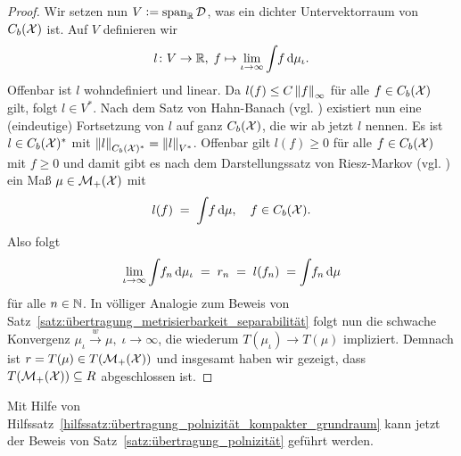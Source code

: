 \documentclass[../thesis/thesis.tex]{subfiles}
\begin{document}
\begin{proof}
		Wir setzen nun $V \vcentcolon = \mathrm{span}_{\mathbb{R}} \, \mathcal{D}$, was ein dichter Untervektorraum von $C_b(\mathcal{X})$ ist. Auf $V$ definieren wir
		\[ l \colon V \to \mathbb{R}, \; f \mapsto \lim_{\iota \to \infty} \int_{} \, f \, \mathrm{d}\mu_\iota  \text{.} \]
		Offenbar ist $l$ wohndefiniert und linear. Da $l(f) \leq C \left\lVert f\right\rVert_\infty$ für alle $f \in C_b(\mathcal{X})$ gilt, folgt $l \in V^\ast$. Nach dem Satz von Hahn-Banach (vgl. \cite[Corollary 5.5.2]{Simon.2015})
		existiert nun eine (eindeutige) Fortsetzung von $l$ auf ganz $C_b(\mathcal{X})$, die wir ab jetzt $l$ nennen. Es ist $l \in C_b(\mathcal{X})^\ast$ 
		mit $\left\lVert l\right\rVert_{C_b(\mathcal{X})^\ast} = \left\lVert l\right\rVert_{V^\ast}$. Offenbar gilt $l(f) \geq 0$ für alle $f \in C_b(\mathcal{X})$ mit $f \geq 0$ und damit gibt es 
		nach dem Darstellungssatz von Riesz-Markov (vgl. \cite[Theorem 4.8.8]{Simon.2015}) ein Maß $\mu \in \mathcal{M}_{+}(\mathcal{X})$ mit 
		\[ l(f) \; = \; \int_{} \, f \, \mathrm{d}\mu, \quad f \in C_b(\mathcal{X}) \text{.} \]
		Also folgt
		\[ \lim_{\iota \to \infty} \int_{} \, f_n \, \mathrm{d}\mu_\iota \; = \; r_n \; = \; l(f_n) \; = \int_{} \, f_n \, \mathrm{d}\mu \]
		für alle $n \in \mathbb{N}$. In völliger Analogie zum Beweis von Satz~\ref{satz:übertragung_metrisierbarkeit_separabilität} folgt nun die schwache Konvergenz $\mu_\iota \xrightarrow{w} \mu, \; \iota \to \infty$,
		die wiederum $T(\mu_\iota) \to T(\mu)$ impliziert. Demnach ist $r = T(\mu) \in T(\mathcal{M}_{+}(\mathcal{X}))$ und insgesamt haben wir gezeigt, dass $T(\mathcal{M}_{+}(\mathcal{X})) \subseteq R$ abgeschlossen ist.
	\end{proof}

	Mit Hilfe von Hilfssatz~\ref{hilfssatz:übertragung_polnizität_kompakter_grundraum} kann jetzt der Beweis von Satz~\ref{satz:übertragung_polnizität} geführt werden.
\end{document}

